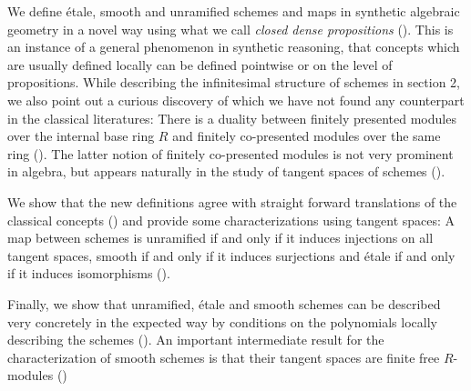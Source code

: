 We define étale, smooth and unramified schemes and maps in synthetic algebraic geometry in a novel way using what we call \emph{closed dense propositions} ().
This is an instance of a general phenomenon in synthetic reasoning, that concepts which are usually defined locally can be defined pointwise or on the level of propositions.
While describing the infinitesimal structure of schemes in section 2, we also point out a curious discovery of which we have not found any counterpart in the classical literatures: There is a duality between finitely presented modules over the internal base ring $R$ and finitely co-presented modules over the same ring ().
The latter notion of finitely co-presented modules is not very prominent in algebra, but appears naturally in the study of tangent spaces of schemes ().

We show that the new definitions agree with straight forward translations of the classical concepts () and provide some characterizations using tangent spaces:
A map between schemes is unramified if and only if it induces injections on all tangent spaces, smooth if and only if it induces surjections and étale if and only if it induces isomorphisms ().

Finally, we show that unramified, étale and smooth schemes can be described very concretely in the expected way by conditions on the polynomials locally describing the schemes (). An important intermediate result for the characterization of smooth schemes is that their tangent spaces are finite free $R$-modules ()
